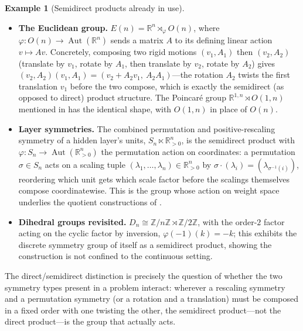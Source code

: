 \documentclass[11pt]{article}
\theoremstyle{plain}
\theoremstyle{definition}
\newtheorem{Example}{Example}[section]
\begin{document}
\begin{Example}[Semidirect products already in use]\label{ex:semidirect-products}
\phantom{u}
\begin{itemize}
    \item \textbf{The Euclidean group.} $E(n) = \mathbb{R}^n \rtimes_\varphi
    O(n)$, where $\varphi : O(n) \to \operatorname{Aut}(\mathbb{R}^n)$ sends a
    matrix $A$ to its defining linear action $v \mapsto Av$. Concretely,
    composing two rigid motions $(v_1, A_1)$ then $(v_2,A_2)$ (translate by
    $v_1$, rotate by $A_1$, then translate by $v_2$, rotate by $A_2$) gives
    $(v_2, A_2)(v_1,A_1) = (v_2 + A_2 v_1,\ A_2 A_1)$---the rotation
    $A_2$ twists the first translation $v_1$ before the two compose, which
    is exactly the semidirect (as opposed to direct) product structure. The
    Poincar\'e group $\mathbb{R}^{1,n} \rtimes O(1,n)$ mentioned in
     has the identical shape, with $O(1,n)$ in
    place of $O(n)$.
    \item \textbf{Layer symmetries.} The combined permutation and
    positive-rescaling symmetry of a hidden layer's units,
    $S_n \ltimes \mathbb{R}_{>0}^n$, is the semidirect product with
    $\varphi : S_n \to \operatorname{Aut}(\mathbb{R}_{>0}^n)$ the permutation
    action on coordinates: a permutation $\sigma \in S_n$ acts on a scaling
    tuple $(\lambda_1,\dots,\lambda_n) \in \mathbb{R}_{>0}^n$ by
    $\sigma \cdot (\lambda_i) = (\lambda_{\sigma^{-1}(i)})$, reordering which
    unit gets which scale factor before the scalings themselves compose
    coordinatewise. This is the group whose action on weight space underlies
    the quotient constructions of
    .
    \item \textbf{Dihedral groups revisited.} $D_n \cong \mathbb{Z}/n\mathbb{Z}
    \rtimes \mathbb{Z}/2\mathbb{Z}$, with the order-$2$ factor acting on the
    cyclic factor by inversion, $\varphi(-1)(k) = -k$; this exhibits the
    discrete symmetry group of  itself as a
    semidirect product, showing the construction is not confined to the
    continuous setting.
\end{itemize}
\end{Example}

The direct/semidirect distinction is precisely the question of whether the
two symmetry types present in a problem interact: wherever a rescaling
symmetry and a permutation symmetry (or a rotation and a translation) must be
composed in a fixed order with one twisting the other, the semidirect
product---not the direct product---is the group that actually acts.
\end{document}

